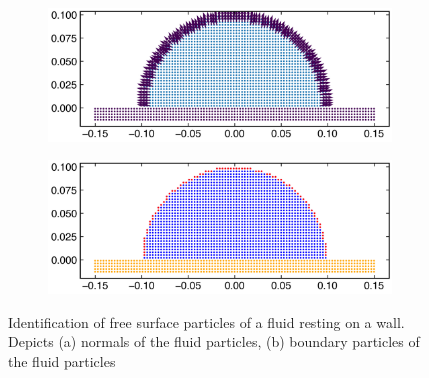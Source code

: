 \documentclass[preprint,12pt]{elsarticle}
\begin{document}
\begin{figure}[!htpb]
  \centering
  \begin{subfigure}{0.48\textwidth}
    \centering
    \includegraphics[width=1\linewidth]{figures/free_surface_identification_demonstration/circle_with_boundary_normals}
    \subcaption{}%
    \label{fig:boundary-particles-circle-wall-normals}
  \end{subfigure}
  \begin{subfigure}{0.48\textwidth}
    \centering
    \includegraphics[width=1\linewidth]{figures/free_surface_identification_demonstration/circle_with_boundary}
    \subcaption{}%
    \label{fig:boundary-particles-circle-wall-bp}
  \end{subfigure}
  \caption{Identification of free surface particles of a fluid resting on a
    wall. Depicts (a) normals of the fluid particles, (b) boundary particles
    of the fluid particles}
\label{fig:boundary-particles-circle-wall}
\end{figure}
\end{document}
